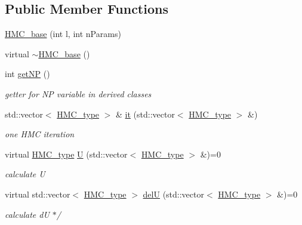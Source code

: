 \subsection*{Public Member Functions}
\begin{DoxyCompactItemize}
\item 
\hyperlink{class_h_m_c__base_a57549355656d15b406ffc0e89cb51be5}{H\-M\-C\-\_\-base} (int l, int n\-Params)
\item 
virtual \hyperlink{class_h_m_c__base_a27825ebbf86563706ed8f63b18367152}{$\sim$\-H\-M\-C\-\_\-base} ()
\item 
int \hyperlink{class_h_m_c__base_aa83e21d17eadcb907415a832560eb10d}{get\-N\-P} ()
\begin{DoxyCompactList}\small\item\em getter for N\-P variable in derived classes \end{DoxyCompactList}\item 
std\-::vector$<$ \hyperlink{define__type_8h_a9adf655d34223b34db3baff5c7ce420c}{H\-M\-C\-\_\-type} $>$ \& \hyperlink{class_h_m_c__base_a92b0fbc606f8c7c9e4e30f58f731921b}{it} (std\-::vector$<$ \hyperlink{define__type_8h_a9adf655d34223b34db3baff5c7ce420c}{H\-M\-C\-\_\-type} $>$ \&)
\begin{DoxyCompactList}\small\item\em one H\-M\-C iteration \end{DoxyCompactList}\item 
virtual \hyperlink{define__type_8h_a9adf655d34223b34db3baff5c7ce420c}{H\-M\-C\-\_\-type} \hyperlink{class_h_m_c__base_aab381fd0838b1a831906025b98a0c897}{U} (std\-::vector$<$ \hyperlink{define__type_8h_a9adf655d34223b34db3baff5c7ce420c}{H\-M\-C\-\_\-type} $>$ \&)=0
\begin{DoxyCompactList}\small\item\em calculate U \end{DoxyCompactList}\item 
virtual std\-::vector$<$ \hyperlink{define__type_8h_a9adf655d34223b34db3baff5c7ce420c}{H\-M\-C\-\_\-type} $>$ \hyperlink{class_h_m_c__base_acd263756d76e967e6ab678456cb88550}{del\-U} (std\-::vector$<$ \hyperlink{define__type_8h_a9adf655d34223b34db3baff5c7ce420c}{H\-M\-C\-\_\-type} $>$ \&)=0
\begin{DoxyCompactList}\small\item\em calculate d\-U $\ast$/ \end{DoxyCompactList}\end{DoxyCompactItemize}
